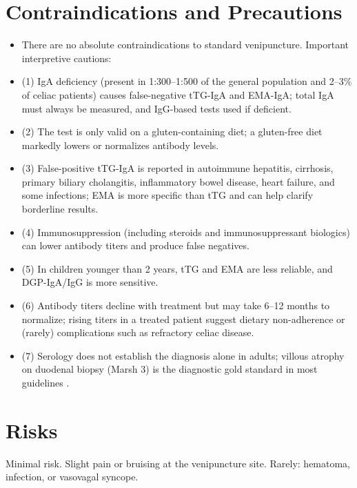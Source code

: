 \section*{Contraindications and Precautions}
\begin{itemize}
  \item There are no absolute contraindications to standard venipuncture. Important interpretive cautions:
  \item (1) IgA deficiency (present in 1:300--1:500 of the general population and 2--3\% of celiac patients) causes false-negative tTG-IgA and EMA-IgA; total IgA must always be measured, and IgG-based tests used if deficient.
  \item (2) The test is only valid on a gluten-containing diet; a gluten-free diet markedly lowers or normalizes antibody levels.
  \item (3) False-positive tTG-IgA is reported in autoimmune hepatitis, cirrhosis, primary biliary cholangitis, inflammatory bowel disease, heart failure, and some infections; EMA is more specific than tTG and can help clarify borderline results.
  \item (4) Immunosuppression (including steroids and immunosuppressant biologics) can lower antibody titers and produce false negatives.
  \item (5) In children younger than 2 years, tTG and EMA are less reliable, and DGP-IgA/IgG is more sensitive.
  \item (6) Antibody titers decline with treatment but may take 6--12 months to normalize; rising titers in a treated patient suggest dietary non-adherence or (rarely) complications such as refractory celiac disease.
  \item (7) Serology does not establish the diagnosis alone in adults; villous atrophy on duodenal biopsy (Marsh 3) is the diagnostic gold standard in most guidelines \cite{altoma2019european}.
\end{itemize}
\section*{Risks}
Minimal risk. Slight pain or bruising at the venipuncture site. Rarely: hematoma, infection, or vasovagal syncope.

